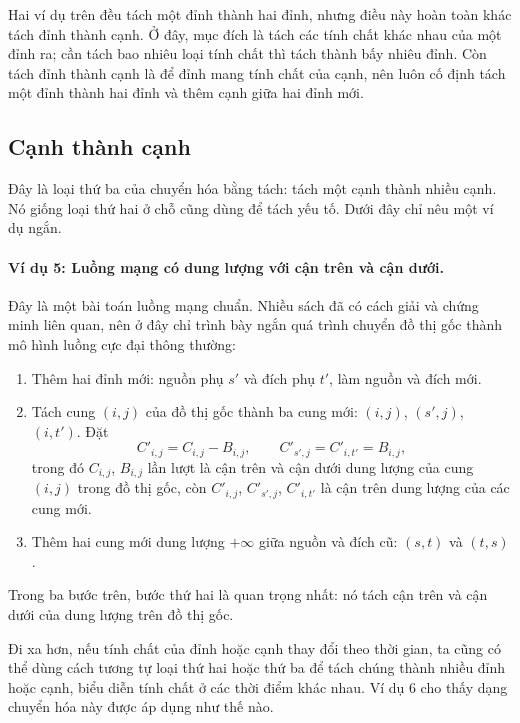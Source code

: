 \documentclass[11pt]{article}
\begin{document}
Hai ví dụ trên đều tách một đỉnh thành hai đỉnh, nhưng điều này hoàn toàn
khác tách đỉnh thành cạnh. Ở đây, mục đích là tách các tính chất khác nhau
của một đỉnh ra; cần tách bao nhiêu loại tính chất thì tách thành bấy nhiêu
đỉnh. Còn tách đỉnh thành cạnh là để đỉnh mang tính chất của cạnh, nên luôn
cố định tách một đỉnh thành hai đỉnh và thêm cạnh giữa hai đỉnh mới.

\subsection{Cạnh thành cạnh}

Đây là loại thứ ba của chuyển hóa bằng tách: tách một cạnh thành nhiều cạnh.
Nó giống loại thứ hai ở chỗ cũng dùng để tách yếu tố. Dưới đây chỉ nêu một
ví dụ ngắn.

\paragraph{Ví dụ 5: Luồng mạng có dung lượng với cận trên và cận dưới.}
Đây là một bài toán luồng mạng chuẩn. Nhiều sách đã có cách giải và chứng
minh liên quan, nên ở đây chỉ trình bày ngắn quá trình chuyển đồ thị gốc
thành mô hình luồng cực đại thông thường:
\begin{enumerate}
  \item Thêm hai đỉnh mới: nguồn phụ \(s'\) và đích phụ \(t'\), làm nguồn và
  đích mới.
  \item Tách cung \((i,j)\) của đồ thị gốc thành ba cung mới:
  \((i,j)\), \((s',j)\), \((i,t')\). Đặt
  \[
    C'_{i,j}=C_{i,j}-B_{i,j},\qquad
    C'_{s',j}=C'_{i,t'}=B_{i,j},
  \]
  trong đó \(C_{i,j}\), \(B_{i,j}\) lần lượt là cận trên và cận dưới dung
  lượng của cung \((i,j)\) trong đồ thị gốc, còn \(C'_{i,j}\),
  \(C'_{s',j}\), \(C'_{i,t'}\) là cận trên dung lượng của các cung mới.
  \item Thêm hai cung mới dung lượng \(+\infty\) giữa nguồn và đích cũ:
  \((s,t)\) và \((t,s)\).
\end{enumerate}
Trong ba bước trên, bước thứ hai là quan trọng nhất: nó tách cận trên và cận
dưới của dung lượng trên đồ thị gốc.

Đi xa hơn, nếu tính chất của đỉnh hoặc cạnh thay đổi theo thời gian, ta cũng
có thể dùng cách tương tự loại thứ hai hoặc thứ ba để tách chúng thành nhiều
đỉnh hoặc cạnh, biểu diễn tính chất ở các thời điểm khác nhau. Ví dụ 6 cho
thấy dạng chuyển hóa này được áp dụng như thế nào.
\end{document}
